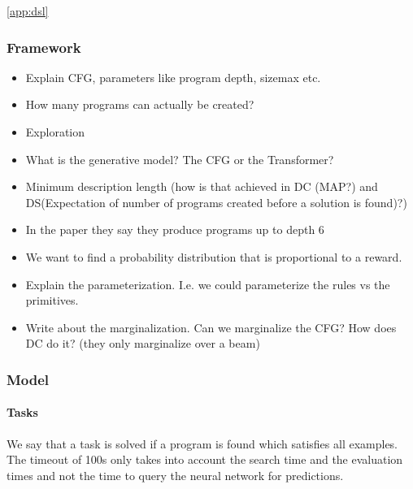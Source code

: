 \ref{app:dsl}






















\subsubsection{Framework}






\begin{itemize}
    \item Explain CFG, parameters like program depth, sizemax etc. 
    \item How many programs can actually be created?
    \item Exploration
    \item What is the generative model? The CFG or the Transformer?
    \item Minimum description length (how is that achieved in DC (MAP?) and DS(Expectation of number of programs created before a solution is found)?)
    \item In the paper they say they produce programs up to depth 6
    \item We want to find a probability distribution that is proportional to a reward.
    \item Explain the parameterization. I.e. we could parameterize the rules vs the primitives. 
    \item Write about the marginalization. Can we marginalize the CFG? How does DC do it? (they only marginalize over a beam) 
\end{itemize}


\subsubsection{Model}









\paragraph{Tasks}
We say that a task is solved if a program is found which satisfies all examples. The timeout of 100s only takes into account the search time and the evaluation times and not the time to query the neural network for predictions.


